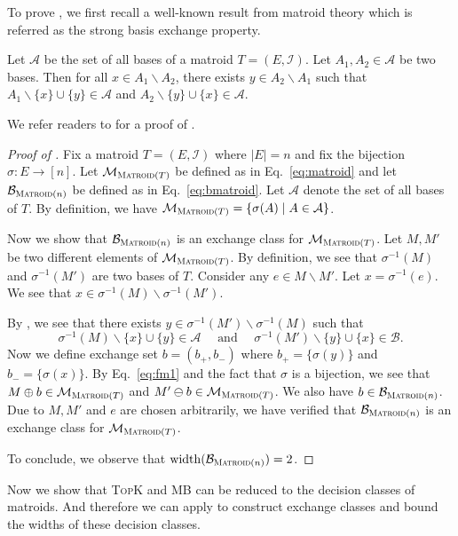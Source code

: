 \documentclass{article}
\newcommand{\M}{\mathcal M}
\newcommand{\B}{\mathcal B}
\newcommand{\del}{\backslash}
\DeclareMathOperator{\rank}{width}
\newcommand{\MultiIdent}{\textsc{TopK}\xspace}
\newcommand{\MultiBandit}{\textsc{MB}\xspace}
\newcommand{\Matroid}{\textsc{Matroid}\xspace}
\begin{document}
To prove , we first recall a well-known result from matroid theory which is referred as the strong basis exchange property.
\begin{lemma}
\label{lemma:basis-exchange}
Let $\mathcal A$ be the set of all bases of a matroid $T=(E,\mathcal I)$. 
Let $A_1,A_2 \in \mathcal A$ be two bases.
Then for all $x \in A_1\del A_2$, there exists $y\in A_2\del A_1$ 
such that $A_1\del \{x\} \cup \{y\} \in \mathcal A$ and $A_2\del\{y\}\cup\{x\} \in \mathcal A$.
\end{lemma}
We refer readers to \citep{oxley2006matroid} for a proof of .


\begin{proof}[Proof of ]
Fix a matroid $T=(E,\mathcal I)$ where $|E|=n$ and fix the bijection $\sigma\colon E\rightarrow [n]$.
Let $\M_{\Matroid(T)}$ be defined as in Eq.~\eqref{eq:matroid} and let $\B_{\Matroid(n)}$ be defined as in Eq.~\eqref{eq:bmatroid}.
Let $\mathcal A$ denote the set of all bases of $T$. 
By definition, we have $\M_{\Matroid(T)} = \{\sigma(A) \mid A\in\mathcal A\}$.

Now we show that $\B_{\Matroid(n)}$ is an exchange class for $\M_{\Matroid(T)}$.
Let $M,M'$ be two different elements of $\M_{\Matroid(T)}$. 
By definition, we see that $\sigma^{-1}(M)$ and $\sigma^{-1}(M')$ are two bases of $T$.
Consider any $e\in M\del M'$. Let $x = \sigma^{-1}(e)$. 
We see that $x\in \sigma^{-1}(M) \del \sigma^{-1}(M')$. 

By , we see that there exists $y \in \sigma^{-1}(M') \del \sigma^{-1}(M)$ 
such that 
\begin{equation}
\label{eq:fm1}
\sigma^{-1}(M) \del \{x\} \cup \{y\} \in \mathcal A\quad\text{ and }\quad\sigma^{-1}(M') \del \{y\} \cup \{x\} \in \mathcal B.
\end{equation}
Now we define exchange set $b=(b_+,b_-)$ where $b_+ = \{\sigma(y)\}$ and $b_-=\{\sigma(x)\}$. 
By Eq.~\eqref{eq:fm1} and the fact that $\sigma$ is a bijection, we see that $M\oplus b \in \M_{\Matroid(T)}$ and $M'\ominus b \in \M_{\Matroid(T)}$. We also have $b\in \B_{\Matroid(n)}$.
Due to $M,M'$ and $e$ are chosen arbitrarily, we have verified that $\B_{\Matroid(n)}$ is an exchange class for $\M_{\Matroid(T)}$.

To conclude, we observe that $\rank(\B_{\Matroid(n)}) = 2$.
\end{proof}

Now we show that \MultiIdent and \MultiBandit can be reduced to the decision classes of matroids. 
And therefore we can apply  to construct exchange classes and bound the widths of these decision classes.
\end{document}
